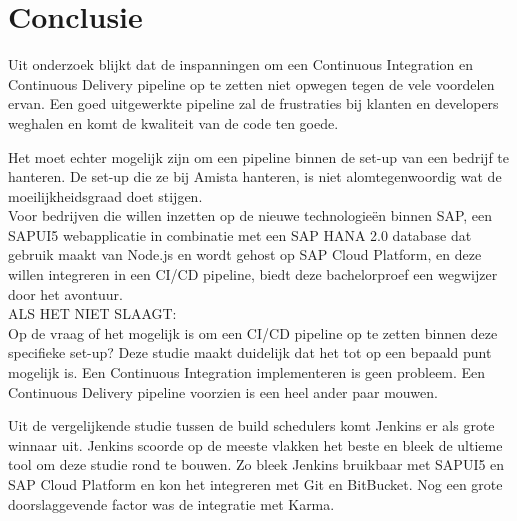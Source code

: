 
\chapter{Conclusie}
\label{ch:conclusie}



Uit onderzoek blijkt dat de inspanningen om een Continuous Integration en Continuous Delivery pipeline op te zetten niet opwegen tegen de vele voordelen ervan. Een goed uitgewerkte pipeline zal de frustraties bij klanten en developers weghalen en komt de kwaliteit van de code ten goede.

Het moet echter mogelijk zijn om een pipeline binnen de set-up van een bedrijf te hanteren. De set-up die ze bij Amista hanteren, is niet alomtegenwoordig wat de moeilijkheidsgraad doet stijgen. \\
Voor bedrijven die willen inzetten op de nieuwe technologieën binnen SAP, een SAPUI5 webapplicatie in combinatie met een SAP HANA 2.0 database dat gebruik maakt van Node.js en wordt gehost op SAP Cloud Platform, en deze willen integreren in een CI/CD pipeline, biedt deze bachelorproef een wegwijzer door het avontuur.\\

ALS HET NIET SLAAGT:\\
Op de vraag of het mogelijk is om een CI/CD pipeline op te zetten binnen deze specifieke set-up? Deze studie maakt duidelijk dat het tot op een bepaald punt mogelijk is. Een Continuous Integration implementeren is geen probleem. Een Continuous Delivery pipeline voorzien is een heel ander paar mouwen.

Uit de vergelijkende studie tussen de build schedulers komt Jenkins er als grote winnaar uit. Jenkins scoorde op de meeste vlakken het beste en bleek de ultieme tool om deze studie rond te bouwen. Zo bleek Jenkins bruikbaar met SAPUI5 en SAP Cloud Platform en kon het integreren met Git en BitBucket. Nog een grote doorslaggevende factor was de integratie met Karma.

